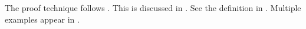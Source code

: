 \documentclass[a4paper,10pt,fleqn]{article}
\begin{document}
\noindent The proof technique follows \citep{spivey92}. This is discussed in \citep[p. 42]{spivey92}. See the definition in \citep[p. 15]{woodcock96}. Multiple examples appear in \citep[pp. 10-15]{woodcock96}.

\bigskip

\setlength{\leftskip}{0pt}




\end{document}
